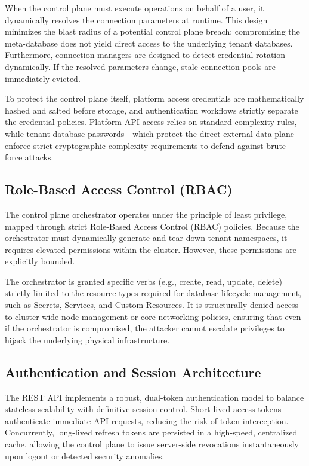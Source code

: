 When the control plane must execute operations on behalf of a user, it dynamically resolves the connection parameters at runtime. This design minimizes the blast radius of a potential control plane breach: compromising the meta-database does not yield direct access to the underlying tenant databases. Furthermore, connection managers are designed to detect credential rotation dynamically. If the resolved parameters change, stale connection pools are immediately evicted.

To protect the control plane itself, platform access credentials are mathematically hashed and salted before storage, and authentication workflows strictly separate the credential policies. Platform API access relies on standard complexity rules, while tenant database passwords—which protect the direct external data plane—enforce strict cryptographic complexity requirements to defend against brute-force attacks.

\subsection{Role-Based Access Control (RBAC)}

The control plane orchestrator operates under the principle of least privilege, mapped through strict Role-Based Access Control (RBAC) policies. Because the orchestrator must dynamically generate and tear down tenant namespaces, it requires elevated permissions within the cluster. However, these permissions are explicitly bounded. 

The orchestrator is granted specific verbs (e.g., create, read, update, delete) strictly limited to the resource types required for database lifecycle management, such as Secrets, Services, and Custom Resources. It is structurally denied access to cluster-wide node management or core networking policies, ensuring that even if the orchestrator is compromised, the attacker cannot escalate privileges to hijack the underlying physical infrastructure.

\subsection{Authentication and Session Architecture}

The REST API implements a robust, dual-token authentication model to balance stateless scalability with definitive session control. Short-lived access tokens authenticate immediate API requests, reducing the risk of token interception. Concurrently, long-lived refresh tokens are persisted in a high-speed, centralized cache, allowing the control plane to issue server-side revocations instantaneously upon logout or detected security anomalies.

